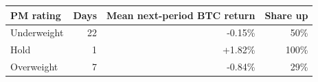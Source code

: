 \begin{tabular}{lrrr}
\toprule
PM rating & Days & Mean next-period BTC return & Share up \\
\midrule
Underweight & 22 & -0.15\% & 50\% \\
Hold & 1 & +1.82\% & 100\% \\
Overweight & 7 & -0.84\% & 29\% \\
\bottomrule
\end{tabular}